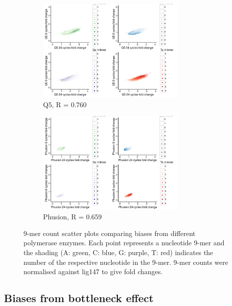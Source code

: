 \documentclass[a4paper, numbers=noenddot]{scrbook}
\begin{document}
\begin{figure}[htbp]
  \ContinuedFloat
  \centering  
  \begin{subfigure}[htbp]{0.8\textwidth}
    \centering
    \includegraphics[width=0.8\textwidth]{kmer_q5}
    \caption{Q5, R = 0.760}
    \label{fig:kmer_enz_q5}
  \end{subfigure}
  \begin{subfigure}[htbp]{0.8\textwidth}
    \centering
    \includegraphics[width=0.8\textwidth]{kmer_phusion}
    \caption{Phusion, R = 0.659}
    \label{fig:kmer_enz_phusion}
  \end{subfigure}
  \caption{9-mer count scatter plots comparing biases from different polymerase enzymes.  Each point represents a nucleotide 9-mer and the shading (A: green, C: blue, G: purple, T: red) indicates the number of the respective nucleotide in the 9-mer.  9-mer counts were normalised against lig147 to give fold changes.}
\end{figure}

\subsection{Biases from bottleneck effect}
\label{ssec:pcrbias_result_bn}
\end{document}
